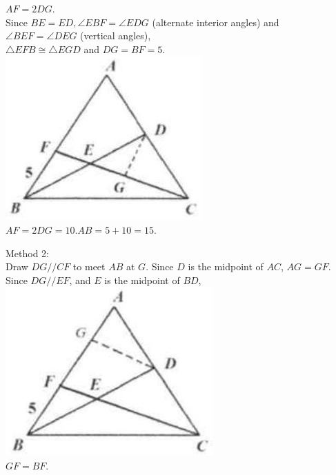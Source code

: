 \documentclass{article}
\begin{document}
\(A F=2 D G\).\\
Since \(B E=E D, \angle E B F=\angle E D G\) (alternate interior angles) and \(\angle B E F=\angle D E G\) (vertical angles),\\
\(\triangle E F B \cong \triangle E G D\) and \(D G=B F=5\).\\
\centering
\includegraphics[width=\textwidth]{images/103(1).jpg}\\
\(A F=2 D G=10 . A B=5+10=15\).

Method 2:\\
Draw \(D G / / C F\) to meet \(A B\) at \(G\). Since \(D\) is the midpoint of \(A C\), \(A G=G F\).\\
Since \(D G / / E F\), and \(E\) is the midpoint of \(B D\),\\
\centering
\includegraphics[width=\textwidth]{images/103(2).jpg}\\
\(G F=B F\).
\end{document}

